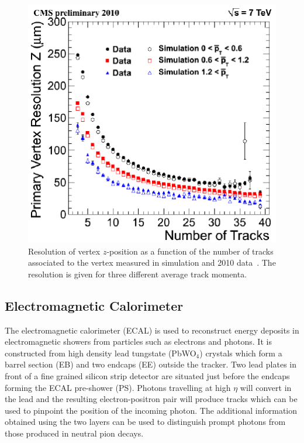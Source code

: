 \begin{figure}
\begin{center}
	\includegraphics[width=.6\textwidth]{detector/trcker/zresotrcker.pdf}
	\caption{Resolution of vertex $z$-position as a function of the number 
	of tracks associated to the vertex measured in simulation and 
	2010 data~\citep{TRK-10-005}.
 	The resolution is given for three different average track momenta.}
	\label{fig:vtxreso}
\end{center}
\end{figure}

\subsection{Electromagnetic Calorimeter}
The electromagnetic calorimeter (ECAL) is used to reconstruct energy deposits in electromagnetic showers 
from particles such as electrons and photons. 
It is constructed from high density lead tungstate (PbWO$_{4}$) crystals which
form a barrel section (EB) and two endcaps (EE) outside the tracker. 
Two lead plates in front of a fine grained silicon strip detector are situated just before the 
endcaps forming the ECAL pre-shower (PS). 
Photons travelling at high $\eta$ will convert in the lead and the resulting electron-positron pair
will produce tracks which can be used to pinpoint the position of the incoming photon. The additional
information obtained using the two layers can be used to distinguish prompt photons from those produced
in neutral pion decays.

